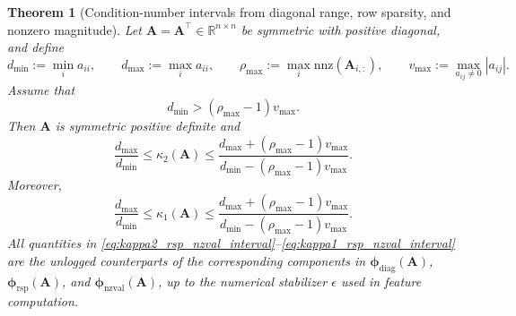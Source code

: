 \documentclass[11pt,a4paper]{article}
\theoremstyle{plain}
\newtheorem{theorem}{Theorem}[section]
\theoremstyle{definition}
\theoremstyle{remark}
\begin{document}
\begin{theorem}[Condition-number intervals from diagonal range, row sparsity, and nonzero magnitude]
\label{thm:rsp_nzval_bounds}
Let $\mathbf{A}=\mathbf{A}^\top\in\mathbb{R}^{n\times n}$ be symmetric with positive diagonal, and define
\begin{equation*}
d_{\min}:=\min_i a_{ii},
\qquad
d_{\max}:=\max_i a_{ii},
\qquad
\rho_{\max}:=\max_i \mathrm{nnz}(\mathbf{A}_{i,:}),
\qquad
v_{\max}:=\max_{a_{ij}\neq 0}|a_{ij}|.
\end{equation*}
Assume that
\begin{equation}
\label{eq:sparsity_value_dominance}
d_{\min}>(\rho_{\max}-1)v_{\max}.
\end{equation}
Then $\mathbf{A}$ is symmetric positive definite and
\begin{equation}
\label{eq:kappa2_rsp_nzval_interval}
\frac{d_{\max}}{d_{\min}}
\le
\kappa_2(\mathbf{A})
\le
\frac{d_{\max}+(\rho_{\max}-1)v_{\max}}
{d_{\min}-(\rho_{\max}-1)v_{\max}}.
\end{equation}
Moreover,
\begin{equation}
\label{eq:kappa1_rsp_nzval_interval}
\frac{d_{\max}}{d_{\min}}
\le
\kappa_1(\mathbf{A})
\le
\frac{d_{\max}+(\rho_{\max}-1)v_{\max}}
{d_{\min}-(\rho_{\max}-1)v_{\max}}.
\end{equation}
All quantities in \eqref{eq:kappa2_rsp_nzval_interval}--\eqref{eq:kappa1_rsp_nzval_interval} are the unlogged counterparts of the corresponding components in $\bm{\phi}_{\mathrm{diag}}(\mathbf{A})$, $\bm{\phi}_{\mathrm{rsp}}(\mathbf{A})$, and $\bm{\phi}_{\mathrm{nzval}}(\mathbf{A})$, up to the numerical stabilizer $\epsilon$ used in feature computation.
\end{theorem}
\end{document}
